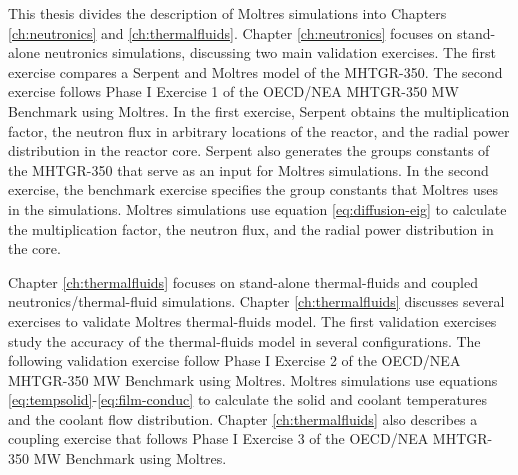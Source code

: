This thesis divides the description of Moltres simulations into Chapters \ref{ch:neutronics} and \ref{ch:thermalfluids}.
Chapter \ref{ch:neutronics} focuses on stand-alone neutronics simulations, discussing two main validation exercises.
The first exercise compares a Serpent and Moltres model of the MHTGR-350.
The second exercise follows Phase I Exercise 1 of the OECD/NEA MHTGR-350 MW Benchmark using Moltres.
In the first exercise, Serpent obtains the multiplication factor, the neutron flux in arbitrary locations of the reactor, and the radial power distribution in the reactor core.
Serpent also generates the groups constants of the MHTGR-350 that serve as an input for Moltres simulations.
In the second exercise, the benchmark exercise specifies the group constants that Moltres uses in the simulations.
Moltres simulations use equation \ref{eq:diffusion-eig} to calculate the multiplication factor, the neutron flux, and the radial power distribution in the core.

Chapter \ref{ch:thermalfluids} focuses on stand-alone thermal-fluids and coupled neutronics/thermal-fluid simulations.
Chapter \ref{ch:thermalfluids} discusses several exercises to validate Moltres thermal-fluids model.
The first validation exercises study the accuracy of the thermal-fluids model in several configurations.
The following validation exercise follow Phase I Exercise 2 of the OECD/NEA MHTGR-350 MW Benchmark using Moltres.
Moltres simulations use equations \ref{eq:tempsolid}-\ref{eq:film-conduc} to calculate the solid and coolant temperatures and the coolant flow distribution.
Chapter \ref{ch:thermalfluids} also describes a coupling exercise that follows Phase I Exercise 3 of the OECD/NEA MHTGR-350 MW Benchmark using Moltres.
